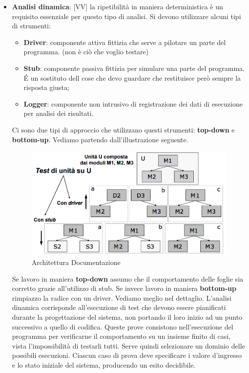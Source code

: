 \begin{itemize}
	\item \textbf{Analisi dinamica}: [VV] la ripetibilità in maniera deterministica è un requisito essenziale per questo tipo di analisi. Si devono utilizzare alcuni tipi di strumenti:
		\begin{itemize}
			\item \textbf{Driver}: componente attiva fittizia che serve a pilotare un parte del programma. (non è ciò che voglio testare)
			\item \textbf{Stub}: componente passiva fittizia per simulare una parte del programma. \'E un sostituto dell cose che devo guardare che restituisce però sempre la risposta giusta;
			\item \textbf{Logger}: componente non intrusivo di registrazione dei dati di esecuzione per analisi dei risultati.
		\end{itemize}
		\noindent
		Ci sono due tipi di approccio che utilizzano questi strumenti: \textbf{top-down} e \textbf{bottom-up}. Vediamo partendo dall'illustrazione seguente.
		\begin{figure}[htbp]
			\centering
			\includegraphics[scale=0.45]{img/stub_driver.png}
			\caption{Architettura Documentazione}
			\label{fig:arch_doc}
		\end{figure}
		Se lavoro in maniera \textbf{top-down} assumo che il comportamento delle foglie sia corretto grazie all'utilizzo di stub. Se invece lavoro in maniera \textbf{bottom-up} rimpiazzo la radice con un driver. Vediamo meglio nel dettaglio. \newline
		L'analisi dinamica corrisponde all'esecuzione di test che devono essere pianificati durante la progettazione del sistema, non portando il loro inizio ad un punto successivo a quello di codifica. Queste prove consistono nell'esecuzione del programma per verificarne il comportamento su un insieme finito di casi, vista l'impossibilità di testarli tutti. Serve quindi selezionare un dominio delle possibili esecuzioni. Ciascun caso di prova deve specificare i valore d'ingresso e lo stato iniziale del sistema, producendo un esito decidibile.







\end{itemize}
